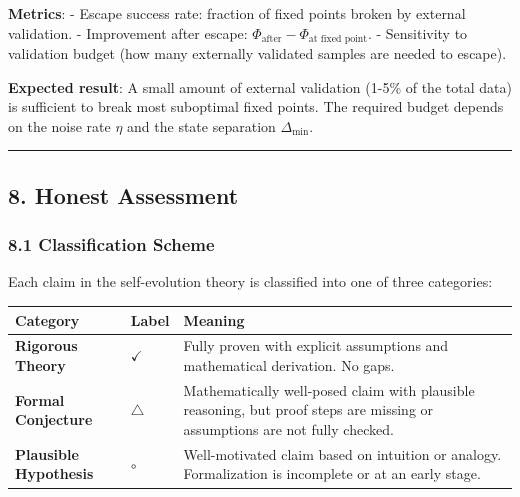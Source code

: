 \documentclass[
  12pt,
]{article}
\begin{document}
\textbf{Metrics}: - Escape success rate: fraction of fixed points broken
by external validation. - Improvement after escape:
\(\Phi_{\text{after}} - \Phi_{\text{at fixed point}}\). - Sensitivity to
validation budget (how many externally validated samples are needed to
escape).

\textbf{Expected result}: A small amount of external validation (1-5\%
of the total data) is sufficient to break most suboptimal fixed points.
The required budget depends on the noise rate \(\eta\) and the state
separation \(\Delta_{\min}\).

\begin{center}\rule{0.5\linewidth}{0.5pt}\end{center}

\subsection{8. Honest Assessment}\label{honest-assessment}

\subsubsection{8.1 Classification Scheme}\label{classification-scheme}

Each claim in the self-evolution theory is classified into one of three
categories:

\begin{longtable}[]{@{}
  >{\raggedright\arraybackslash}p{}
  >{\raggedright\arraybackslash}p{}
  >{\raggedright\arraybackslash}p{}@{}}
\toprule\noalign{}
\begin{minipage}[b]{\linewidth}\raggedright
Category
\end{minipage} & \begin{minipage}[b]{\linewidth}\raggedright
Label
\end{minipage} & \begin{minipage}[b]{\linewidth}\raggedright
Meaning
\end{minipage} \\
\midrule\noalign{}
\endhead
\bottomrule\noalign{}
\endlastfoot
\textbf{Rigorous Theory} & \(\checkmark\) & Fully proven with explicit
assumptions and mathematical derivation. No gaps. \\
\textbf{Formal Conjecture} & \(\triangle\) & Mathematically well-posed
claim with plausible reasoning, but proof steps are missing or
assumptions are not fully checked. \\
\textbf{Plausible Hypothesis} & \(\circ\) & Well-motivated claim based
on intuition or analogy. Formalization is incomplete or at an early
stage. \\
\end{longtable}
\end{document}
